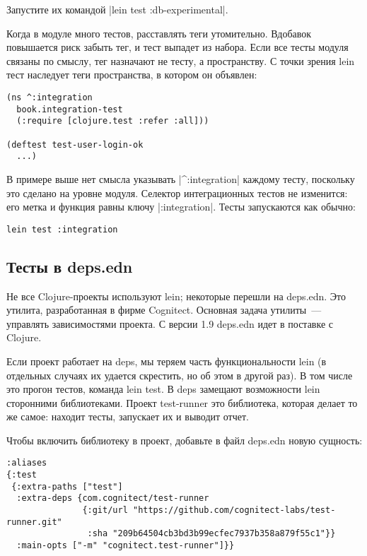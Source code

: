 Запустите их командой \spverb|lein test :db-experimental|.

Когда в модуле много тестов, расставлять теги утомительно. Вдобавок повышается
риск забыть тег, и тест выпадет из набора. Если все тесты модуля связаны по
смыслу, тег назначают не тесту, а пространству. С точки зрения lein тест
наследует теги пространства, в котором он объявлен:

\begin{verbatim}
(ns ^:integration
  book.integration-test
  (:require [clojure.test :refer :all]))

(deftest test-user-login-ok
  ...)
\end{verbatim}

В примере выше нет смысла указывать \spverb|^:integration| каждому тесту,
поскольку это сделано на уровне модуля. Селектор интеграционных тестов не
изменится: его метка и функция равны ключу \spverb|:integration|. Тесты
запускаются как обычно:

\begin{verbatim}
lein test :integration
\end{verbatim}

\subsection{Тесты в deps.edn}

Не все Clojure-проекты используют lein; некоторые перешли на deps.edn. Это
утилита, разработанная в фирме Cognitect. Основная задача утилиты~--- управлять
зависимостями проекта. С версии 1.9 deps.edn идет в поставке с Clojure.

Если проект работает на deps, мы теряем часть функциональности lein (в отдельных
случаях их удается скрестить, но об этом в другой раз). В том числе это прогон
тестов, команда lein test. В deps замещают возможности lein сторонними
библиотеками. Проект test-runner это библиотека, которая делает то же самое:
находит тесты, запускает их и выводит отчет.

Чтобы включить библиотеку в проект, добавьте в файл deps.edn новую сущность:

\begin{verbatim}
:aliases
{:test
 {:extra-paths ["test"]
  :extra-deps {com.cognitect/test-runner
               {:git/url "https://github.com/cognitect-labs/test-runner.git"
                :sha "209b64504cb3bd3b99ecfec7937b358a879f55c1"}}
  :main-opts ["-m" "cognitect.test-runner"]}}
\end{verbatim}

